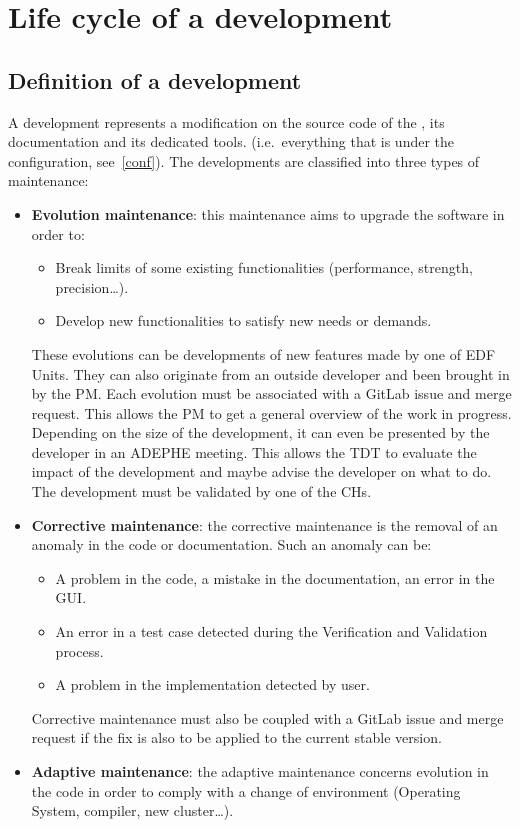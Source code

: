 \section{Life cycle of a development}

\subsection{Definition of a development}
\label{defdev}

A development represents a modification on the source code of the
\telemacsystem{}, its documentation and its dedicated tools. (i.e.\ everything
that is under the configuration, see~\ref{conf}). The developments are
classified into three types of maintenance:
\begin{itemize}
\item \textbf{Evolution maintenance}: this maintenance aims to upgrade the
  software in order to:
  \begin{itemize}
  \item Break limits of some existing functionalities (performance, strength,
    precision\ldots).
  \item Develop new functionalities to satisfy new needs or demands.
  \end{itemize}
  These evolutions can be developments of new features made by one of EDF
  Units. They can also originate from an outside developer and been brought in
  by the PM\@.
  Each evolution must be associated with a GitLab issue and merge request.
  This allows the PM to get a general overview of the work in progress.
  Depending on the size of the development, it can even be presented by the
  developer in an ADEPHE meeting. This allows the TDT to evaluate the impact of
  the development and maybe advise the developer on what to do. The development
  must be validated by one of the CHs.
\item \textbf{Corrective maintenance}: the corrective maintenance is the
  removal of an anomaly in the code or documentation. Such an anomaly can be:
  \begin{itemize}
  \item A problem in the code, a mistake in the documentation, an error in the
    GUI\@.
  \item An error in a test case detected during the Verification and Validation
    process.
  \item A problem in the implementation detected by user.
  \end{itemize}
  Corrective maintenance must also be coupled with a GitLab issue and merge
  request if the fix is also to be applied to the current stable version.
\item \textbf{Adaptive maintenance}: the adaptive maintenance concerns
  evolution in the code in order to comply with a change of environment
  (Operating System, compiler, new cluster\ldots).
\end{itemize}

